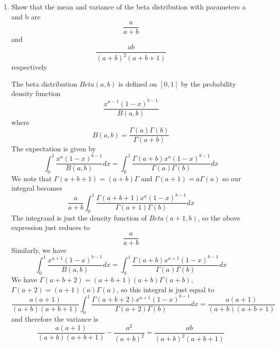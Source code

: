 \documentclass{article}
\newcommand{\chapternumber}{2}
\newenvironment{QandA}{\begin{enumerate}[label=\chapternumber.\arabic*]\bfseries\boldmath}
	{\end{enumerate}}
\newenvironment{answered}{\par\bigskip\normalfont\unboldmath}{}
\begin{document}
\begin{QandA}
		\item Show that the mean and variance of the beta distribution with parameters a and b are \[\frac{a}{a+b}\] and \[\frac{ab}{(a+b)^2(a+b+1)}\]
		respectively
		\begin{answered}
			The beta distribution $Beta(a,b)$ is defined on $[0,1]$ by the probability density function
			\[\frac{x^{a-1}(1-x)^{b-1}}{B(a,b)}\]
			where
			\[B(a,b)=\frac{\Gamma(a)\Gamma(b)}{\Gamma(a+b)}\]
			The expectation is given by 
			\[\int_0^1 \frac{x^a(1-x)^{b-1}}{B(a,b)} dx = \int_0^1 \frac{\Gamma(a+b)x^a(1-x)^{b-1}}{\Gamma(a)\Gamma(b)} dx\]
			We note that $\Gamma(a+b+1)=(a+b)\Gamma$ and $\Gamma(a+1)=a\Gamma(a)$ so our integral becomes
			\[\frac{a}{a+b}\int_0^1 \frac{\Gamma(a+b+1)x^a(1-x)^{b-1}}{\Gamma(a+1)\Gamma(b)} dx\]
			The integrand is just the density function of $Beta(a+1,b)$, so the above expression just reduces to 
			\[\frac{a}{a+b}\]
			Similarly, we have
			\[\int_0^1 \frac{x^{a+1}(1-x)^{b-1}}{B(a,b)} dx = \int_0^1 \frac{\Gamma(a+b)x^{a+1}(1-x)^{b-1}}{\Gamma(a)\Gamma(b)} dx\]
			We have $\Gamma(a+b+2)=(a+b+1)(a+b)\Gamma(a+b)$, $\Gamma(a+2)=(a+1)(a)\Gamma(a)$, so this integral is just equal to
			\[\frac{a(a+1)}{(a+b)(a+b+1)}\int_0^1 \frac{\Gamma(a+b+2)x^{a+1}(1-x)^{b-1}}{\Gamma(a+2)\Gamma(b)} dx = \frac{a(a+1)}{(a+b)(a+b+1)}\]
			and therefore the variance is
			\[\frac{a(a+1)}{(a+b)(a+b+1)}-\frac{a^2}{(a+b)^2} = \frac{ab}{(a+b)^2(a+b+1)}\]
		\end{answered}
	

\end{QandA}
\end{document}
